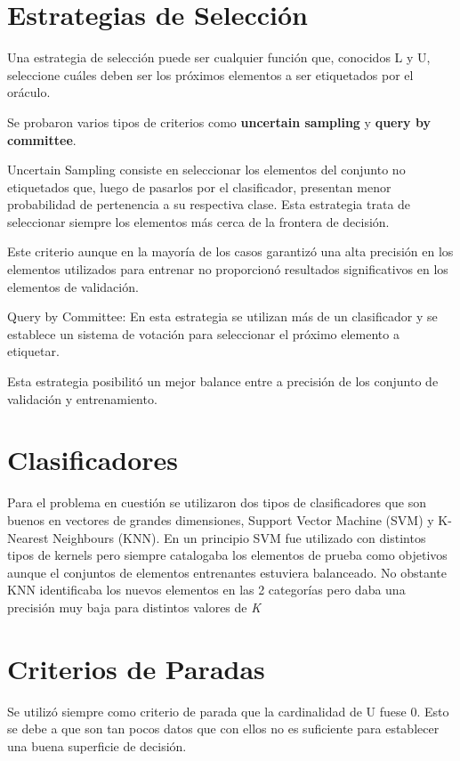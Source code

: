 \documentclass[]{article}
\begin{document}
\section{Estrategias de Selección}

Una estrategia de selección puede ser cualquier función que, conocidos L y U, seleccione cuáles deben ser los próximos elementos a ser etiquetados por el oráculo.

Se probaron varios tipos de criterios como \textbf{uncertain sampling} y \textbf{query by committee}.

Uncertain Sampling consiste en seleccionar los elementos del conjunto no etiquetados que, luego de pasarlos por el clasificador, presentan menor probabilidad de pertenencia a su respectiva clase. Esta estrategia trata de seleccionar siempre los elementos más cerca de la frontera de decisión. 

Este criterio aunque en la mayoría de los casos garantizó una alta precisión en los elementos utilizados para entrenar no proporcionó resultados significativos en los elementos de validación.

Query by Committee: En esta estrategia se utilizan más de un clasificador y se establece un sistema de votación para seleccionar el próximo elemento a etiquetar.

Esta estrategia posibilitó un mejor balance entre a precisión de los conjunto de validación y entrenamiento.

\section{Clasificadores}

Para el problema en cuestión se utilizaron dos tipos de clasificadores que son buenos en vectores de grandes dimensiones, Support Vector Machine (SVM) y K-Nearest Neighbours (KNN). En un principio SVM fue utilizado con distintos tipos de kernels pero siempre catalogaba los elementos de prueba como objetivos aunque el conjuntos de elementos entrenantes estuviera balanceado. No obstante KNN identificaba los nuevos elementos en las 2 categorías pero daba una precisión muy baja para distintos valores de \textit{K}

\section{Criterios de Paradas}

Se utilizó siempre como criterio de parada que la cardinalidad de U fuese 0. Esto se debe a que son tan pocos datos que con ellos no es suficiente para establecer una buena superficie de decisión.
\end{document}
